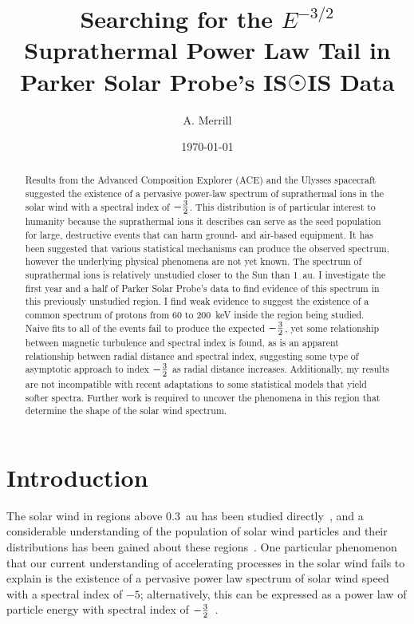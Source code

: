 \documentclass[letterpaper,11pt]{article}
\begin{document}
\title{Searching for the $E^{-3/2}$ Suprathermal Power Law Tail in Parker Solar Probe's IS$\Sun$IS Data}
\author{A. Merrill}
\date{\today}
\maketitle

\linenumbers

\begin{abstract}
Results from the Advanced Composition Explorer (ACE) and the Ulysses spacecraft suggested the existence of a pervasive power-law spectrum of suprathermal ions in the solar wind with a spectral index of $-{3 \over 2}$.  This distribution is of particular interest to humanity because the suprathermal ions it describes can serve as the seed population for large, destructive events that can harm ground- and air-based equipment.  It has been suggested that various statistical mechanisms can produce the observed spectrum, however the underlying physical phenomena are not yet known.  The spectrum of suprathermal ions is relatively unstudied closer to the Sun than \SI{1}{\astronomicalunit}.  I investigate the first year and a half of Parker Solar Probe's data to find evidence of this spectrum in this previously unstudied region. I find weak evidence to suggest the existence of a common spectrum of protons from 60 to \SI{200}{\kilo\electronvolt} inside the region being studied.  Naive fits to all of the events fail to produce the expected $-{3 \over 2}$, yet some relationship between magnetic turbulence and spectral index is found, as is an apparent relationship between radial distance and spectral index, suggesting some type of asymptotic approach to index $-{3 \over 2}$ as radial distance increases.  Additionally, my results are not incompatible with recent adaptations to some statistical models that yield softer spectra.  Further work is required to uncover the phenomena  in  this  region  that  determine  the  shape  of  the  solar  wind spectrum.
\end{abstract}

\section{Introduction}
\label{sec:intro}
The solar wind in regions above \SI{0.3}{\astronomicalunit} has been studied directly~\citep{McComas2007}, and a considerable understanding of the population of solar wind particles and their distributions has been gained about these regions~\citep{Giacalone2002,McComas2007}.  One particular phenomenon that our current understanding of accelerating processes in the solar wind fails to explain is the existence of a pervasive power law spectrum of solar wind speed with a spectral index of $-5$; alternatively, this can be expressed as a power law of particle energy with spectral index of $-{3 \over 2}$~\citep{Fisk2012}.
\end{document}
